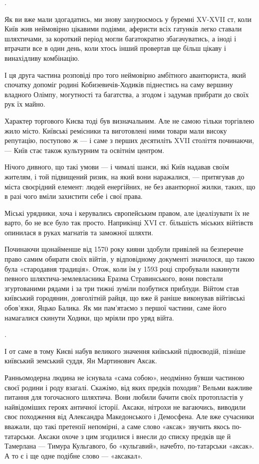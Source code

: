 .

Як ви вже мали здогадатись, ми знову занурюємось у буремні XV-XVII ст, коли
Київ жив неймовірно цікавими подіями, аферисти всіх гатунків легко ставали
шляхтичами, за короткий період могли багатократно збагачуватись, а іноді і
втрачати все в один день, коли хтось інший провертав ще більш цікаву і
винахідливу комбінацію.

І ця друга частина розповіді про того неймовірно амбітного авантюриста, який
спочатку допоміг родині Кобизевичів-Ходиків піднестись на саму вершину владного
Олімпу, могутності та багатства, а згодом і задумав прибрати до своїх рук їх
майно.

Характер торгового Києва тоді був визначальним. Але не самою тільки торгівлею
жило місто. Київські ремісники та виготовлені ними товари мали високу
репутацію, поступово ж — і саме з перших десятиліть XVII століття починаючи, —
Київ стає також культурним та освітнім центром.

Нічого дивного, що такі умови — і чималі шанси, які Київ надавав своїм жителям,
і той підвищений ризик, на який вони наражалися, — притягував до міста
своєрідний елемент: людей енергійних, не без авантюрної жилки, таких, що в разі
чого вміли захистити себе і свої права. 

Міські урядники, хоча і керувались європейським правом, але ідеалізувати їх не
варто, бо не все було так просто. Наприкінці XVI ст. більшість міських
війтівств опинилася в руках магнатів та заможної шляхти. 

Починаючи щонайменше від 1570 року кияни здобули привілей на безперечне право
самим обирати своїх війтів, у відповідному документі значилося, що такою була
«стародавня традиція». Отож, коли їм у 1593 році спробували накинути певного
шляхтича-землевласника Еразма Стравинського, вони повстали згуртованими рядами
і за три тижні зуміли позбутися приблуди. Війтом став київський городянин,
довголітній райця, що вже й раніше виконував війтівські обов’язки, Яцько
Балика. Як ми пам’ятаємо з першої частини, саме його намагалися скинути Ходики,
що мріяли про уряд війта. 

.

І от саме в тому Києві набув великого значення київський підвоєводій, пізніше
київський земський суддя, Ян Мартинович Аксак. 

Ранньомодерна людина не існувала «сама собою», неодмінно бувши частиною своєї
родини і роду взагалі. Скажімо, від яких предків походив? Вельми важливе
питання для тогочасного шляхтича. Вони любили бачити своїх протопластів у
найвідоміших героях античної історії. Аксаки, нітрохи не вагаючись, виводили
своє походження від Александра Македонського і Демосфена. Але вже сучасники
вважали, що такі претензії непомірні, а саме слово «аксак» звучить якось
по-татарськи. Аксаки охоче з цим згодилися і внесли до списку предків ще й
Тамерлана — Тимура Кульгавого, бо «кульгавий», начебто, по-татарськи «аксак». А
то є і ще одне подібне слово — «аксакал».


